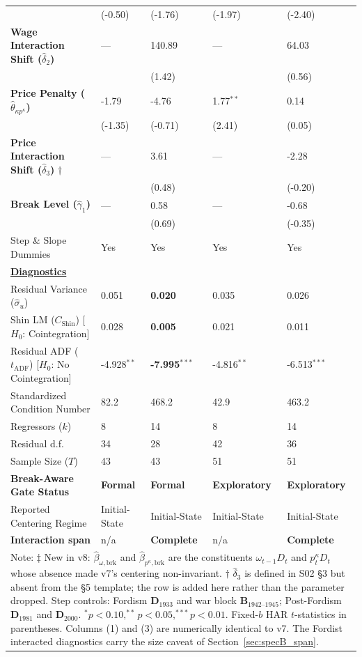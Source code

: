\documentclass[11pt,a4paper]{article}
\begin{document}
\begin{table}[H]
\begin{tabular}{p{5.5cm}p{2.5cm}p{2.5cm}p{2.5cm}p{2.5cm}}
 & {\scriptsize (-0.50)} & {\scriptsize (-1.76)} & {\scriptsize (-1.97)} & {\scriptsize (-2.40)} \\
\textbf{Wage Interaction Shift ($\hat{\delta}_2$)} & --- & 140.89 & --- & 64.03 \\
 & & {\scriptsize (1.42)} & & {\scriptsize (0.56)} \\
\textbf{Price Penalty ($\hat{\theta}_{\kappa p^{\kappa}}$)} & -1.79 & -4.76 & 1.77$^{**}$ & 0.14 \\
 & {\scriptsize (-1.35)} & {\scriptsize (-0.71)} & {\scriptsize (2.41)} & {\scriptsize (0.05)} \\
\textbf{Price Interaction Shift ($\hat{\delta}_3$)} $\dagger$ & --- & 3.61 & --- & -2.28 \\
 & & {\scriptsize (0.48)} & & {\scriptsize (-0.20)} \\
\textbf{Break Level ($\hat{\gamma}_1$)} & --- & 0.58 & --- & -0.68 \\
 & & {\scriptsize (0.69)} & & {\scriptsize (-0.35)} \\
Step \& Slope Dummies & Yes & Yes & Yes & Yes \\
\midrule
\multicolumn{5}{l}{\underline{\textbf{Diagnostics}}} \\
Residual Variance ($\hat{\sigma}_u$) & 0.051 & \textbf{0.020} & 0.035 & 0.026 \\
Shin LM ($C_{\text{Shin}}$) [$H_0$: Cointegration] & 0.028 & \textbf{0.005} & 0.021 & 0.011 \\
Residual ADF ($t_{\text{ADF}}$) [$H_0$: No Cointegration] & -4.928$^{**}$ & \textbf{-7.995}$^{***}$ & -4.816$^{**}$ & -6.513$^{***}$ \\
Standardized Condition Number & 82.2 & 468.2 & 42.9 & 463.2 \\
Regressors ($k$) & 8 & 14 & 8 & 14 \\
Residual d.f. & 34 & 28 & 42 & 36 \\
Sample Size ($T$) & 43 & 43 & 51 & 51 \\
\textbf{Break-Aware Gate Status} & \textbf{Formal} & \textbf{Formal} & \textbf{Exploratory} & \textbf{Exploratory} \\
Reported Centering Regime & Initial-State & Initial-State & Initial-State & Initial-State \\
\textbf{Interaction span} & n/a & \textbf{Complete} & n/a & \textbf{Complete} \\
\bottomrule
\multicolumn{5}{p{15.5cm}}{\footnotesize Note: $\ddagger$ New in v8: $\hat{\beta}_{\omega, \text{brk}}$ and $\hat{\beta}_{p^{\kappa}, \text{brk}}$ are the constituents $\omega_{t-1}D_t$ and $p_t^{\kappa} D_t$ whose absence made v7's centering non-invariant. $\dagger$ $\hat{\delta}_3$ is defined in S02 \S3 but absent from the \S5 template; the row is added here rather than the parameter dropped. Step controls: Fordism $\mathbf{D}_{1933}$ and war block $\mathbf{B}_{1942\text{--}1945}$; Post-Fordism $\mathbf{D}_{1981}$ and $\mathbf{D}_{2000}$. $^{*}p<0.10, ^{**}p<0.05, ^{***}p<0.01$. Fixed-$b$ HAR $t$-statistics in parentheses. Columns (1) and (3) are numerically identical to v7. The Fordist interacted diagnostics carry the size caveat of Section~\ref{sec:specB_span}.}

\end{tabular}
\end{table}
\end{document}

